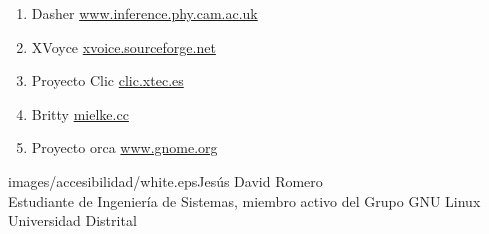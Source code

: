 \begin{multicols}{2}
\begin{enumerate}
\item Dasher \href{http://www.inference.phy.cam.ac.uk/dasher}{www.inference.phy.cam.ac.uk}

\item XVoyce \href{http://xvoice.sourceforge.net/}{xvoice.sourceforge.net}

\item Proyecto Clic \href{http://clic.xtec.es/es/jclic}{clic.xtec.es}

\item Britty \href{http://mielke.cc/brltty/index.html}{mielke.cc}

\item Proyecto orca \href{http://www.gnome.org/projets/orca}{www.gnome.org}



\end{enumerate}

\begin{biografia}{images/accesibilidad/white.eps}{Jesús David Romero} 
\\
Estudiante de Ingeniería de Sistemas, miembro activo del Grupo GNU Linux Universidad Distrital
\end{biografia}

\raggedcolumns
\pagebreak


\end{multicols}

\clearpage
\pagebreak
